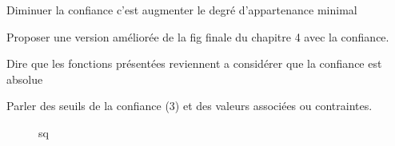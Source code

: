 Diminuer la confiance c'est augmenter le degré d'appartenance minimal

Proposer une version améliorée de la fig finale du chapitre 4 avec la
confiance.

Dire que les fonctions présentées reviennent a considérer que la
confiance est absolue

Parler des seuils de la confiance (3) et des valeurs associées ou
contraintes.


\begin{figure}
  \centering
  
  \caption{sq}
  \label{fig:qs}
\end{figure}





